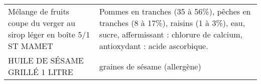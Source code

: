 \begin{longtable}{p{5cm}p{10cm}}
                                   Mélange de fruits coupe du verger au sirop léger en boîte 5/1 ST MAMET &                                                                                                                                                                                                                                                                                                                                                                                                                                                                                                                                                                                                                                                                                                                                                                                                                                                                           Pommes en tranches (35 à 56\%), pêches en tranches (8 à 17\%), raisins (1 à 3\%), eau, sucre, affermissant : chlorure de calcium, antioxydant : acide ascorbique. \\
                                                                           HUILE DE SÉSAME GRILLÉ 1 LITRE &                                                                                                                                                                                                                                                                                                                                                                                                                                                                                                                                                                                                                                                                                                                                                                                                                                                                                                                                                                                                            graines de sésame (allergène) \\

\end{longtable}
